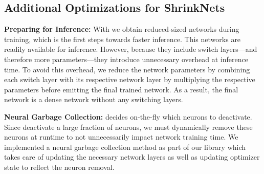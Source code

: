 
\subsection{Additional Optimizations for ShrinkNets}

\noindent\textbf{Preparing for Inference: } With \shrink we obtain
reduced-sized networks during training, which is the first steps towards faster
inference. This networks are readily available for inference. However, because
they include switch layers---and therefore more parameters---they introduce
unnecessary overhead at inference time. To avoid this overhead, we reduce the
network parameters by combining each switch layer with its respective network
layer by multiplying the respective parameters before emitting the final trained
network. As a result, the final network is a dense network without any switching layers. 

\noindent\textbf{Neural Garbage Collection: } \shrink decides on-the-fly which
neurons to deactivate. Since \shrink deactivate a large fraction of neurons, we must
dynamically remove these neurons at runtime to not unnecessarily impact network
training time. We implemented a neural garbage collection method as part of our
library which takes care of updating the necessary network layers as well as
updating optimizer state to reflect the neuron removal.


